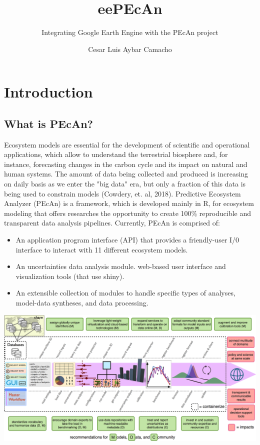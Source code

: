 \documentclass{eepecan}
\author{Cesar Luis Aybar Camacho %
}
\title{eePEcAn}
\subtitle{Integrating Google Earth Engine with the PEcAn project}
\begin{document}
    
	\charitetitle
	\section{Introduction}
	\subsection{What is PEcAn?}
	Ecosystem models are essential for the development of scientific and operational applications, which allow to understand the terrestrial biosphere and, for instance, forecasting changes in the carbon cycle and its impact on natural and human systems. The amount of data being collected and produced is increasing on daily basis as we enter the "big data" era, but only a fraction of this data is being used to constrain models (Cowdery, et. al, 2018). Predictive Ecosystem Analyzer (PEcAn) is a framework, which is developed mainly in R, for ecosystem modeling that offers researches the opportunity to create 100\% reproducible and transparent data analysis pipelines. Currently,  PEcAn is comprised of:
	\begin{itemize}
	\item An application program interface (API) that provides a friendly-user I/0 interface to interact with 11 different ecosystem models.
 	\item An uncertainties data analysis module.
	web-based user interface and visualization tools (that use shiny).
	\item An extensible collection of modules to handle specific types of analyses, model-data syntheses, and data processing.
	\end{itemize}

	\begin{novspacecenter}
		\includegraphics[width=160mm]{figures/fig01_main}
		\label{fig:fig01main}
	\end{novspacecenter}
\end{document}
